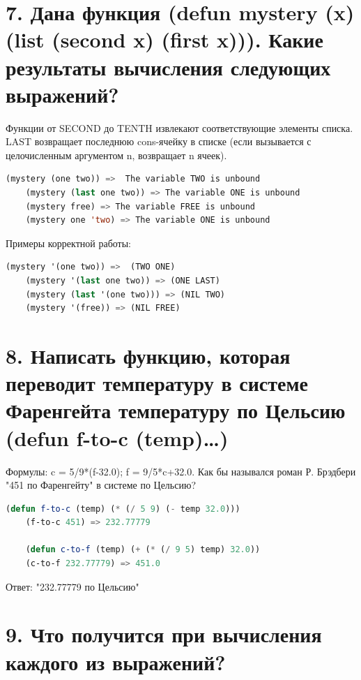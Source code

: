 \documentclass[12pt]{report}
\begin{document}
\clearpage
\section*{7. Дана функция (defun mystery (x) (list (second x) (first x))). Какие результаты вычисления следующих выражений?}

Функции от SECOND до TENTH извлекают соответствующие элементы списка. LAST	возвращает последнюю cons-ячейку в списке (если вызывается с целочисленным аргументом n, возвращает n ячеек).

\begin{lstlisting}[language=Lisp]
	(mystery (one two)) =>  The variable TWO is unbound 
	(mystery (last one two)) => The variable ONE is unbound
	(mystery free) => The variable FREE is unbound
	(mystery one 'two) => The variable ONE is unbound
\end{lstlisting}

Примеры корректной работы:
\begin{lstlisting}[language=Lisp]
	(mystery '(one two)) =>  (TWO ONE)
	(mystery '(last one two)) => (ONE LAST)
	(mystery (last '(one two))) => (NIL TWO)
	(mystery '(free)) => (NIL FREE)
\end{lstlisting}

\section*{8. Написать функцию, которая переводит температуру в системе Фаренгейта температуру по Цельсию (defun f-to-c (temp)…)}

Формулы: c = 5/9*(f-32.0); f = 9/5*c+32.0. Как бы назывался роман Р. Брэдбери "451 по Фаренгейту" в системе по Цельсию?

\begin{lstlisting}[language=Lisp]
	(defun f-to-c (temp) (* (/ 5 9) (- temp 32.0)))
	(f-to-c 451) => 232.77779
	
	(defun c-to-f (temp) (+ (* (/ 9 5) temp) 32.0))
	(c-to-f 232.77779) => 451.0
\end{lstlisting}

Ответ: "232.77779 по Цельсию"



\section*{9. Что получится при вычисления каждого из выражений?}
\end{document}
